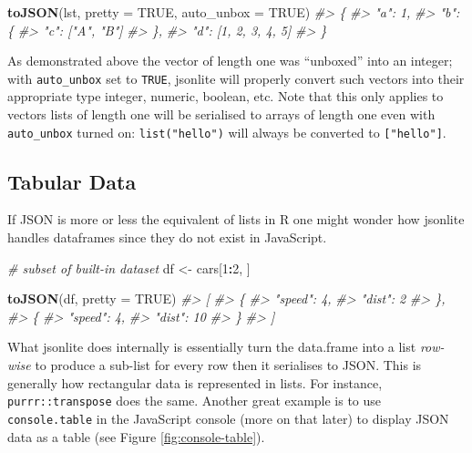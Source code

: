 \documentclass[10pt,]{krantz}
\makeatletter
\newenvironment{Shaded}{\begin{snugshade}}{\end{snugshade}}
\newcommand{\CommentTok}[1]{\textcolor[rgb]{0.37,0.37,0.37}{\textit{#1}}}
\newcommand{\DataTypeTok}[1]{\textcolor[rgb]{0.27,0.27,0.27}{#1}}
\newcommand{\DecValTok}[1]{\textcolor[rgb]{0.06,0.06,0.06}{#1}}
\newcommand{\KeywordTok}[1]{\textcolor[rgb]{0.27,0.27,0.27}{\textbf{#1}}}
\newcommand{\NormalTok}[1]{#1}
\newcommand{\OperatorTok}[1]{\textcolor[rgb]{0.43,0.43,0.43}{\textbf{#1}}}
\newcommand{\OtherTok}[1]{\textcolor[rgb]{0.37,0.37,0.37}{#1}}
\newcommand{\StringTok}[1]{\textcolor[rgb]{0.5,0.5,0.5}{#1}}
\newenvironment{kframe}{%
\medskip{}
\setlength{\fboxsep}{.8em}
 \def\at@end@of@kframe{}%
 \ifinner\ifhmode%
  \def\at@end@of@kframe{\end{minipage}}%
  \begin{minipage}{\columnwidth}%
 \fi\fi%
 \def\FrameCommand##1{\hskip\@totalleftmargin \hskip-\fboxsep
 \colorbox{shadecolor}{##1}\hskip-\fboxsep
     \hskip-\linewidth \hskip-\@totalleftmargin \hskip\columnwidth}%
 \MakeFramed {\advance\hsize-\width
   \@totalleftmargin\z@ \linewidth\hsize
   \@setminipage}}%
 {\par\unskip\endMakeFramed%
 \at@end@of@kframe}
\renewenvironment{Shaded}{\begin{kframe}}{\end{kframe}}
\makeatother
\begin{document}
\begin{Shaded}
\begin{Highlighting}[]
\KeywordTok{toJSON}\NormalTok{(lst, }\DataTypeTok{pretty =} \OtherTok{TRUE}\NormalTok{, }\DataTypeTok{auto_unbox =} \OtherTok{TRUE}\NormalTok{)}
\CommentTok{#> \{}
\CommentTok{#>   "a": 1,}
\CommentTok{#>   "b": \{}
\CommentTok{#>     "c": ["A", "B"]}
\CommentTok{#>   \},}
\CommentTok{#>   "d": [1, 2, 3, 4, 5]}
\CommentTok{#> \}}
\end{Highlighting}
\end{Shaded}

As demonstrated above the vector of length one was ``unboxed'' into an integer; with \texttt{auto\_unbox} set to \texttt{TRUE}, jsonlite will properly convert such vectors into their appropriate type integer, numeric, boolean, etc. Note that this only applies to vectors lists of length one will be serialised to arrays of length one even with \texttt{auto\_unbox} turned on: \texttt{list("hello")} will always be converted to \texttt{{[}"hello"{]}}.

\hypertarget{basics-tabular}{%
\subsection{Tabular Data}\label{basics-tabular}}

If JSON is more or less the equivalent of lists in R one might wonder how jsonlite handles dataframes since they do not exist in JavaScript.

\begin{Shaded}
\begin{Highlighting}[]
\CommentTok{# subset of built-in dataset}
\NormalTok{df <-}\StringTok{ }\NormalTok{cars[}\DecValTok{1}\OperatorTok{:}\DecValTok{2}\NormalTok{, ]}

\KeywordTok{toJSON}\NormalTok{(df, }\DataTypeTok{pretty =} \OtherTok{TRUE}\NormalTok{)}
\CommentTok{#> [}
\CommentTok{#>   \{}
\CommentTok{#>     "speed": 4,}
\CommentTok{#>     "dist": 2}
\CommentTok{#>   \},}
\CommentTok{#>   \{}
\CommentTok{#>     "speed": 4,}
\CommentTok{#>     "dist": 10}
\CommentTok{#>   \}}
\CommentTok{#> ]}
\end{Highlighting}
\end{Shaded}

What jsonlite does internally is essentially turn the data.frame into a list \emph{row-wise} to produce a sub-list for every row then it serialises to JSON. This is generally how rectangular data is represented in lists. For instance, \texttt{purrr::transpose} does the same. Another great example is to use \texttt{console.table} in the JavaScript console (more on that later) to display JSON data as a table (see Figure \ref{fig:console-table}).
\end{document}
